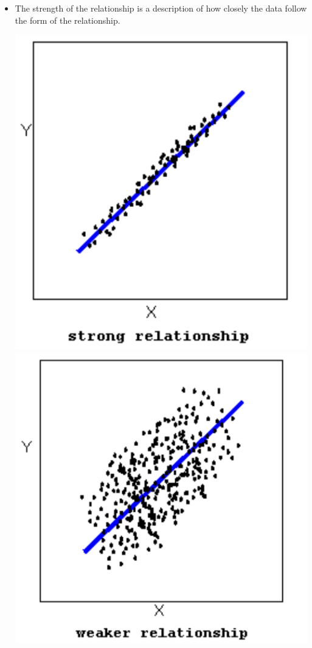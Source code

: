 \begin{itemize}
\item
  The strength of the relationship is a description of how closely the
  data follow the form of the relationship.

  \begin{center}
    \includegraphics[scale=0.4]{Figures/strong-relation}
    \includegraphics[scale=0.4]{Figures/weaker-relationship}

\end{center}
\end{itemize}
